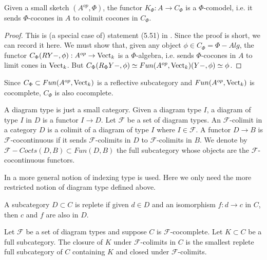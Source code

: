 \begin{lemma}
Given a small sketch $(A^{op},\Phi)$, the functor $K_{\Phi}:A\to C_{\Phi}$ is a $\Phi$-comodel, i.e. it sends $\Phi$-cocones in $A$ to colimit cocones in $C_{\Phi}$.\end{lemma}
\begin{proof}This is (a special case of) statement (5.51) in \cite{kelly/basic-concepts-enriched}. Since the proof is short, we can record it here. We must show that, given any object $\phi\in C_{\Phi}=\Phi-Alg$, the functor $C_{\Phi}(RY-,\phi):A^{op}\to\operatorname{Vect}_k$ is a $\Phi$-algebra, i.e. sends $\Phi$-cocones in $A$ to limit cones in $\operatorname{Vect}_k$. But $C_{\Phi}(R_{\Phi}Y-,\phi)\simeq Fun(A^{op},\operatorname{Vect}_k)(Y-,\phi)\simeq\phi$.\end{proof}


\begin{remark}

Since $C_{\Phi}\subset Fun(A^{op},\operatorname{Vect}_k)$ is a reflective subcategory and $Fun(A^{op},\operatorname{Vect}_k)$ is cocomplete, $C_{\Phi}$ is also cocomplete.\end{remark}

\begin{definition}
A diagram type is just a small category. Given a diagram type $I$, a diagram of type $I$ in $D$ is a functor $I\to D$. Let $\mathcal{F}$ be a set of diagram types. An $\mathcal{F}$-colimit in a category $D$ is a colimit of a diagram of type $I$ where $I\in \mathcal{F}$. A functor $D\to B$ is $\mathcal{F}$-cocontinuous if it sends $\mathcal{F}$-colimits in $D$ to $\mathcal{F}$-colimits in $B$. We denote by $\mathcal{F}-Cocts(D,B)\subset Fun(D,B)$ the full subcategory whose objects are the $\mathcal{F}$-cocontinuous functors.\end{definition}

\begin{remark}
 In \cite{kelly/basic-concepts-enriched} a more general notion of indexing type is used. Here we only need the more restricted notion of diagram type defined above.\end{remark}

\begin{definition}

A subcategory $D\subset C$ is replete if given $d\in D$ and an isomorphism $f:d\to c$ in $C$, then $c$ and $f$ are also in $D$.\end{definition}


\begin{definition}
Let $\mathcal{F}$ be a set of diagram types and suppose $C$ is $\mathcal{F}$-cocomplete. Let $K\subset C$ be a full subcategory. The closure of $K$ under $\mathcal{F}$-colimits in $C$ is the smallest replete full subcategory of $C$ containing $K$ and closed under $\mathcal{F}$-colimits. \end{definition}

